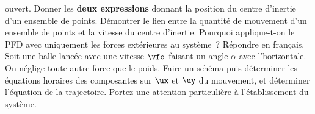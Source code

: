 \documentclass[a4paper, 10pt, final, garamond]{book}
\begin{document}
\begin{enumerate}[label=\sqenumi]
	ouvert.
	\smallbreak
	\vspace{-15pt}
	Donner les \textbf{deux expressions} donnant la position du centre
	d'inertie d'un ensemble de points. Démontrer le lien entre la quantité de
	mouvement d'un ensemble de points et la vitesse du centre d'inertie. Pourquoi
	applique-t-on le PFD avec uniquement les forces extérieures au système~?
	Répondre en français.
	\smallbreak
	Soit une balle lancée avec une vitesse $\vfo$ faisant un angle $\alpha$ avec
	l'horizontale. On néglige toute autre force que le poids. Faire un schéma puis
	déterminer les équations horaires des composantes sur $\ux$ et $\uy$ du
	mouvement, et déterminer l'équation de la trajectoire. Portez une attention
	particulière à l'établissement du système.
	\smallbreak
\end{enumerate}
\end{document}
